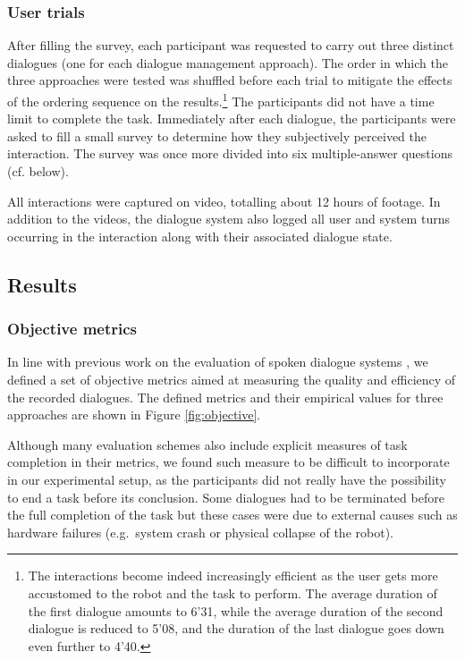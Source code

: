 \subsubsection*{User trials}

After filling the survey, each participant was requested to carry out three distinct dialogues (one for each dialogue management approach).  The order in which the three approaches were tested was shuffled before each trial to mitigate the effects of the ordering sequence on the results.\footnote{The interactions become indeed increasingly efficient as the user gets more accustomed to the robot and the task to perform.  The average duration of the first dialogue amounts to 6'31, while the average duration of the second dialogue is reduced to 5'08, and the duration of the last dialogue goes down even further to 4'40.}  The participants did not have a time limit to complete the task. Immediately after each dialogue, the participants were asked to fill a small survey to determine how they subjectively perceived the interaction.  The survey was once more divided into six multiple-answer questions (cf. below).  

All interactions were captured on video, totalling about 12 hours of footage. In addition to the videos, the dialogue system also logged all user and system turns occurring in the interaction along with their associated dialogue state.


\subsection{Results}
\label{sec:results-exp3}

\subsubsection*{Objective metrics}

In line with previous work on the evaluation of spoken dialogue systems \citep[see e.g.][ch.~6 for an overview]{2009Jokinen}, we defined a set of objective metrics aimed at measuring the quality and efficiency of the recorded dialogues.  The defined metrics and their empirical values for three approaches are shown in Figure \ref{fig:objective}.

Although many evaluation schemes also include explicit measures of task completion in their metrics, we found such measure to be difficult to incorporate in our experimental setup, as the participants did not really have the possibility to end a task before its conclusion. Some dialogues had to be terminated before the full completion of the task but these cases were due to external causes such as hardware failures (e.g.\ system crash or physical collapse of the robot).
 
